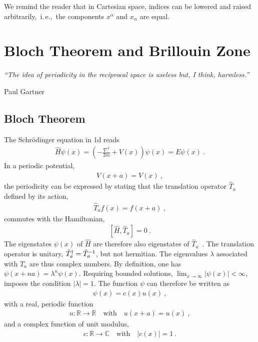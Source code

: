 We remind the reader that in Cartesian space, indices can be lowered and raised arbitrarily,~i.\,e.,~the components $x^\alpha$ and $x_\alpha$ are equal.

\chapter{Bloch Theorem and Brillouin Zone}
\epigraph{\singlespacing \it ``The idea of periodicity in the reciprocal space is useless but, I think, harmless.''}{Paul Gartner}
\section{Bloch Theorem}
\label{sec:BlochTheorem}
The Schr\"odinger equation in 1d reads
\begin{align}
	\hat H \psi (x) = \left( - \frac{\nabla^2}{2m} + V(x) \right) \psi (x) = E \psi (x)~.
	\label{eq:app.bloch.se}
\end{align}
In a periodic potential,
\begin{align}
	V(x + a) = V(x)~,
	\label{eq:app.bloch.potential}
\end{align}
the periodicity can be expressed by stating that the translation operator $\hat T_a$ defined by its action,
\begin{align}
	\hat T_a f(x) = f(x + a)~,
	\label{eq:app.bloch.Ta}
\end{align}
commutes with the Hamiltonian,
\begin{align}
	\left[ \hat H , \hat T_a\right] = 0~.
	\label{eq:app.bloch.commute}
\end{align}
The eigenstates $\psi (x)$ of $\hat H$ are therefore also eigenstates of $\hat T_a$~\cite{Basdevant2000}. The translation operator is unitary, ${\hat T}^\dagger_a = \hat{T}_a^{-1}$, but not hermitian. The eigenvalues $\lambda$ associated with $\hat T_a$ are thus complex numbers. By definition, one has \mbox{$\psi ( x + na ) = \lambda^n \psi(x)$}. Requiring bounded solutions, $\lim_{x \rightarrow \infty} \lvert \psi (x) \rvert < \infty$, imposes the condition $\lvert \lambda \rvert = 1$.
The function $\psi$ can therefore be written as
\begin{align}
	\psi (x) = c(x) u(x)~,
\end{align}
with a real, periodic function
\begin{align}
	u: \mathds R \rightarrow \mathds R
	\quad\text{with}\quad u(x + a) = u(x)~,
\end{align}
and a complex function of unit modulus,
\begin{align}
	c: \mathds R \rightarrow \mathds C
	\quad\text{with}\quad \left\lvert c(x) \right\rvert = 1~.
	\label{eq:app.bloch.c1}
\end{align}
